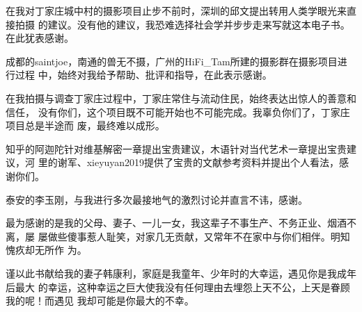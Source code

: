 \begin{acknowledgement}

  在我对丁家庄城中村的摄影项目止步不前时，深圳的邱文提出转用人类学眼光来直接拍摄
  的建议。没有他的建议，我恐难选择社会学并步步走来写就这本电子书。在此犹表感谢。
  
  成都的saintjoe，南通的兽无不摄，广州的HiFi\_Tam所建的摄影群在摄影项目进行过程
  中，始终对我给予帮助、批评和指导，在此表示感谢。

  在我拍摄与调查丁家庄过程中，丁家庄常住与流动住民，始终表达出惊人的善意和信任，
  没有你们，这个项目既不可能开始也不可能完成。我辜负你们了，丁家庄项目总是半途而
  废，最终难以成形。
  
  知乎的阿迦陀针对维基解密一章提出宝贵建议，木语针对当代艺术一章提出宝贵建议，河
  里的谢军、xieyuyan2019提供了宝贵的文献参考资料并提出个人看法，感谢你们。

  泰安的李玉刚，与我进行多次最接地气的激烈讨论并直言不讳，感谢。

  最为感谢的是我的父母、妻子、一儿一女，我这辈子不事生产、不务正业、烟酒不离，屡
  屡做些傻事惹人耻笑，对家几无贡献，又常年不在家中与你们相伴。明知愧疚却无所作
  为。
  
  谨以此书献给我的妻子韩康利，家庭是我童年、少年时的大幸运，遇见你是我成年后最大
  的幸运，这种幸运之巨大使我没有任何理由去埋怨上天不公，上天是眷顾我的呢！而遇见
  我却可能是你最大的不幸。

\end{acknowledgement}
